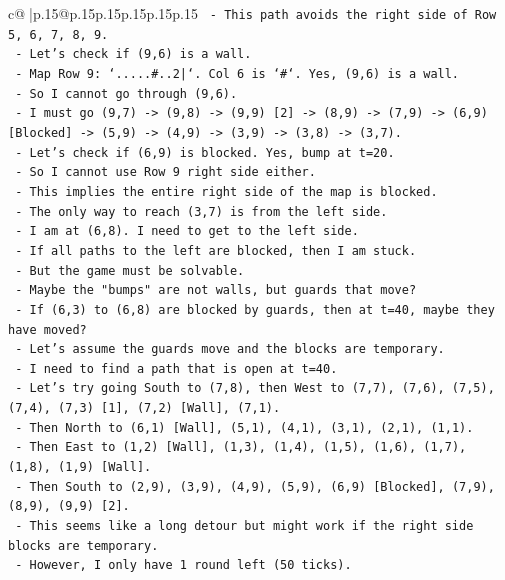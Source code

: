 \documentclass{article}
\begin{document}
{\begin{supertabular}{c@{$\;$}|p{.15\linewidth}@{}p{.15\linewidth}p{.15\linewidth}p{.15\linewidth}p{.15\linewidth}p{.15\linewidth}}
{{{\texttt{  {-} This path avoids the right side of Row 5, 6, 7, 8, 9.} \\
\texttt{  {-} Let's check if (9,6) is a wall.} \\
\texttt{  {-} Map Row 9: `.....\#..2|`. Col 6 is `\#`. Yes, (9,6) is a wall.} \\
\texttt{  {-} So I cannot go through (9,6).} \\
\texttt{  {-} I must go (9,7) {-}> (9,8) {-}> (9,9) {[}2{]} {-}> (8,9) {-}> (7,9) {-}> (6,9) {[}Blocked{]} {-}> (5,9) {-}> (4,9) {-}> (3,9) {-}> (3,8) {-}> (3,7).} \\
\texttt{  {-} Let's check if (6,9) is blocked. Yes, bump at t=20.} \\
\texttt{  {-} So I cannot use Row 9 right side either.} \\
\texttt{  {-} This implies the entire right side of the map is blocked.} \\
\texttt{  {-} The only way to reach (3,7) is from the left side.} \\
\texttt{  {-} I am at (6,8). I need to get to the left side.} \\
\texttt{  {-} If all paths to the left are blocked, then I am stuck.} \\
\texttt{  {-} But the game must be solvable.} \\
\texttt{  {-} Maybe the "bumps" are not walls, but guards that move?} \\
\texttt{  {-} If (6,3) to (6,8) are blocked by guards, then at t=40, maybe they have moved?} \\
\texttt{  {-} Let's assume the guards move and the blocks are temporary.} \\
\texttt{  {-} I need to find a path that is open at t=40.} \\
\texttt{  {-} Let's try going South to (7,8), then West to (7,7), (7,6), (7,5), (7,4), (7,3) {[}1{]}, (7,2) {[}Wall{]}, (7,1).} \\
\texttt{  {-} Then North to (6,1) {[}Wall{]}, (5,1), (4,1), (3,1), (2,1), (1,1).} \\
\texttt{  {-} Then East to (1,2) {[}Wall{]}, (1,3), (1,4), (1,5), (1,6), (1,7), (1,8), (1,9) {[}Wall{]}.} \\
\texttt{  {-} Then South to (2,9), (3,9), (4,9), (5,9), (6,9) {[}Blocked{]}, (7,9), (8,9), (9,9) {[}2{]}.} \\
\texttt{  {-} This seems like a long detour but might work if the right side blocks are temporary.} \\
\texttt{  {-} However, I only have 1 round left (50 ticks).} \\
}}}
\end{supertabular}}
\end{document}
